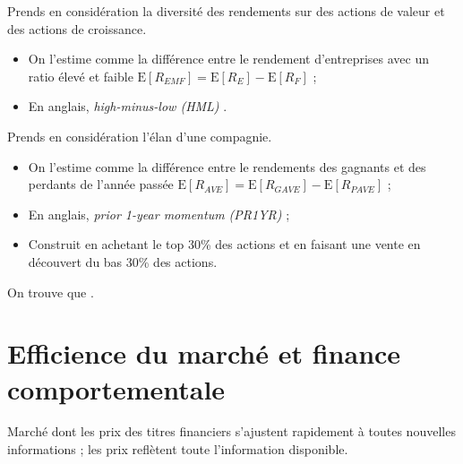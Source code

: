 \documentclass[10pt, french]{article}
\begin{document}
\begin{multicols*}{2}
\begin{definitionNOHFILLsub}
Prends en considération la diversité des rendements sur des actions de valeur et des actions de croissance.	\\

\begin{itemize}
	\item	On l'estime comme la différence entre le rendement d'entreprises avec un ratio élevé et faible $\text{E}[R_{EMF}]	=	\text{E}[R_{E}]	-	\text{E}[R_{F}]$ ;
	\item	En anglais, \og \textit{high-minus-low (HML)} \fg{}.
\end{itemize}
\end{definitionNOHFILLsub}

\begin{definitionNOHFILLsub}
Prends en considération l'élan d'une compagnie.	\\

\begin{itemize}
	\item	On l'estime comme la différence entre le rendements des gagnants et des perdants de l'année passée $\text{E}[R_{AVE}]	=	\text{E}[R_{GAVE}]	-	\text{E}[R_{PAVE}]$ ;
	\item	En anglais, \og \textit{prior 1-year momentum (PR1YR)} \fg{} ;
	\item	Construit en achetant le top 30\% des actions et en faisant une vente en découvert du bas 30\% des actions.
\end{itemize}
\end{definitionNOHFILLsub}

On trouve que 	.



\newpage
\setcounter{section}{38} %
\section{Efficience du marché et finance comportementale}
\begin{definitionNOHFILL}
Marché dont les prix des titres financiers s'ajustent rapidement à toutes nouvelles informations ; les prix reflètent toute l'information disponible.



\end{definitionNOHFILL}
\end{multicols*}
\end{document}
